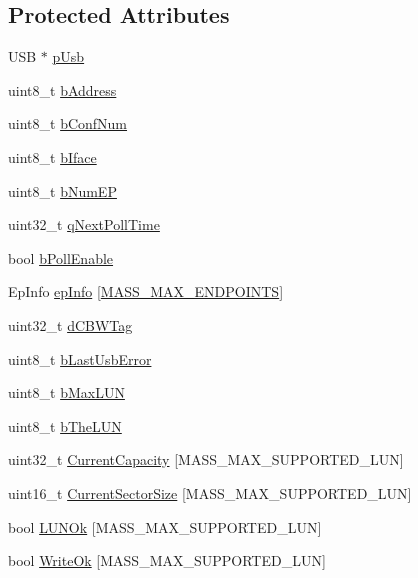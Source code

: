 \subsection*{\-Protected \-Attributes}
\begin{DoxyCompactItemize}
\item 
\-U\-S\-B $\ast$ \hyperlink{class_bulk_only_a6b4ae384eea3aacd8bf916439621973a}{p\-Usb}
\item 
uint8\-\_\-t \hyperlink{class_bulk_only_a9968a2119df66fa0093b020e318d8ac6}{b\-Address}
\item 
uint8\-\_\-t \hyperlink{class_bulk_only_ab54f472ec9cd39abdb9f90867943d162}{b\-Conf\-Num}
\item 
uint8\-\_\-t \hyperlink{class_bulk_only_ac18ad598cd9a1ee99f49d51a572a50a4}{b\-Iface}
\item 
uint8\-\_\-t \hyperlink{class_bulk_only_a6cb56ebd0307845321340919e2b35952}{b\-Num\-E\-P}
\item 
uint32\-\_\-t \hyperlink{class_bulk_only_a2d422ee0745cd7c04afff905278c4233}{q\-Next\-Poll\-Time}
\item 
bool \hyperlink{class_bulk_only_a21961ad1130480f534ef3e91f24c56a0}{b\-Poll\-Enable}
\item 
\-Ep\-Info \hyperlink{class_bulk_only_aee2247fd0a251e4da36e8c09bbe6917f}{ep\-Info} \mbox{[}\hyperlink{masstorage_8h_ab4baa1ea500923e1fc59e5991f05fe99}{\-M\-A\-S\-S\-\_\-\-M\-A\-X\-\_\-\-E\-N\-D\-P\-O\-I\-N\-T\-S}\mbox{]}
\item 
uint32\-\_\-t \hyperlink{class_bulk_only_a7ae682d50badd1386a06f30f35a32d1d}{d\-C\-B\-W\-Tag}
\item 
uint8\-\_\-t \hyperlink{class_bulk_only_a20ff3cc4bb15c557f57a8c6200b412d1}{b\-Last\-Usb\-Error}
\item 
uint8\-\_\-t \hyperlink{class_bulk_only_a6bbdd41bf6efc4060f3c36da7d6ed8b2}{b\-Max\-L\-U\-N}
\item 
uint8\-\_\-t \hyperlink{class_bulk_only_a24c051d401f5f1a9ce65c1bc25ab02dd}{b\-The\-L\-U\-N}
\item 
uint32\-\_\-t \hyperlink{class_bulk_only_a73c3f6b8f6f79ad60e5ba05e560b277d}{\-Current\-Capacity} \mbox{[}\-M\-A\-S\-S\-\_\-\-M\-A\-X\-\_\-\-S\-U\-P\-P\-O\-R\-T\-E\-D\-\_\-\-L\-U\-N\mbox{]}
\item 
uint16\-\_\-t \hyperlink{class_bulk_only_aa4e2711c6279d48c63e82a63ad458421}{\-Current\-Sector\-Size} \mbox{[}\-M\-A\-S\-S\-\_\-\-M\-A\-X\-\_\-\-S\-U\-P\-P\-O\-R\-T\-E\-D\-\_\-\-L\-U\-N\mbox{]}
\item 
bool \hyperlink{class_bulk_only_a9f9d9b0925a2cb6b2fb8b10e4d581d28}{\-L\-U\-N\-Ok} \mbox{[}\-M\-A\-S\-S\-\_\-\-M\-A\-X\-\_\-\-S\-U\-P\-P\-O\-R\-T\-E\-D\-\_\-\-L\-U\-N\mbox{]}
\item 
bool \hyperlink{class_bulk_only_af763ffffdd131949322d583fb4cd2737}{\-Write\-Ok} \mbox{[}\-M\-A\-S\-S\-\_\-\-M\-A\-X\-\_\-\-S\-U\-P\-P\-O\-R\-T\-E\-D\-\_\-\-L\-U\-N\mbox{]}
\end{DoxyCompactItemize}
